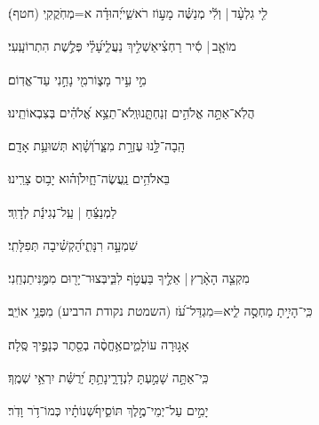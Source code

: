 \documentclass[12pt]{article}
\newcommand{\loc}[1]{\textsuperscript{\locf{#1}}}
\begin{document}
{\loc{ ט}~}‏לִ֤י גִלְעָ֨ד | {\hfill}וְלִ֬י מְנַשֶּׁ֗ה\newline\hspace*{.5em} מָע֣וֹז רֹאשִׁ֑י{\hfill}יְ֝הוּדָ֗ה א=מְחֹֽקֲקִֽי (חטף)׃\par

{\loc{ י}~}‏מוֹאָ֤ב |  סִ֬יר רַחְצִ֗י{\hfill}\newline\hspace*{.5em}אַשְׁלִ֣יךְ נַעֲלִ֑י{\hfill}עָ֝לַ֗י פְּלֶ֣שֶׁת הִתְרוֹעָֽעִי׃\par

{\loc{ יא}~}‏מִ֣י  עִ֣יר מָצ֑וֹר{\hfill}מִ֖י נָחַ֣נִי עַד־אֱדֽוֹם׃\par

{\loc{ יב}~}‏הֲלֹֽא־אַתָּ֣ה אֱלֹהִ֣ים זְנַחְתָּ֑נוּ{\hfill}וְֽלֹא־תֵצֵ֥א אֱ֝לֹהִ֗ים בְּצִבְאוֹתֵֽינוּ׃\par

{\loc{ יג}~}‏הָֽבָה־לָּ֣נוּ עֶזְרָ֣ת מִצָּ֑ר{\hfill}וְ֝שָׁ֗וְא תְּשׁוּעַ֥ת אָדָֽם׃\par

{\loc{ יד}~}‏בֵּאלֹהִ֥ים נַֽעֲשֶׂה־חָ֑יִל{\hfill}וְ֝ה֗וּא יָב֥וּס צָרֵֽינוּ׃\par\pend
\ledpb
\pstart[\subsection*{\textcolor{red}{פרק סא}}]\label{פרק סא}
{\loc{ א}~}‏לַמְנַצֵּ֬חַ | עַֽל־נְגִינַ֬ת לְדָוִֽד׃\par

{\loc{ ב}~}‏שִׁמְעָ֣ה  רִנָּתִ֑י{\hfill}הַ֝קְשִׁ֗יבָה תְּפִלָּתִֽי׃\par

{\loc{ ג}~}‏מִקְצֵ֤ה הָאָ֨רֶץ |  אֵלֶ֣יךָ {\hfill}בַּעֲטֹ֣ף לִבִּ֑י\newline\hspace*{.5em}בְּצוּר־יָר֖וּם מִמֶּ֣נִּי{\hfill}תַנְחֵֽנִי׃\par

{\loc{ ד}~}‏כִּֽי־הָיִ֣יתָ מַחְסֶ֣ה לִ֑י{\hfill}א=מִגְדַּל־עֹ֝ז (השמטת נקודת הרביע) מִפְּנֵ֥י אוֹיֵֽב׃\par

{\loc{ ה}~}‏אָג֣וּרָה  עוֹלָמִ֑ים{\hfill}אֶ֥חֱסֶ֨ה בְסֵ֖תֶר כְּנָפֶ֣יךָ סֶּֽלָה׃\par

{\loc{ ו}~}‏כִּֽי־אַתָּ֣ה  שָׁמַ֣עְתָּ לִנְדָרָ֑י{\hfill}נָתַ֥תָּ יְ֝רֻשַּׁ֗ת יִרְאֵ֥י שְׁמֶֽךָ׃\par

{\loc{ ז}~}‏יָמִ֣ים עַל־יְמֵי־מֶ֣לֶךְ תּוֹסִ֑יף{\hfill}שְׁ֝נוֹתָ֗יו כְּמוֹ־דֹ֥ר וָדֹֽר׃\par
\end{document}
